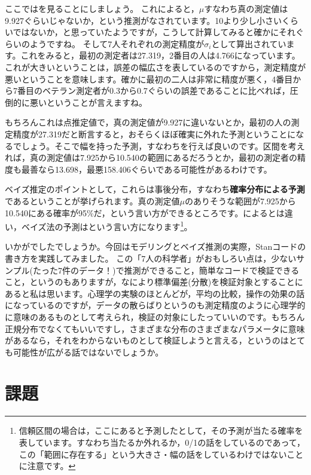 \documentclass{ltjsbook}
\begin{document}
ここではを見ることにしましょう。
これによると，$\mu$すなわち真の測定値は9.927ぐらいじゃないか，という推測がなされています。10より少し小さいくらいではないか，と思っていたようですが，こうして計算してみると確かにそれぐらいのようですね。
そして7人それぞれの測定精度が$\sigma_i$として算出されています。これをみると，最初の測定者は27.319，2番目の人は4.766になっています。これが大きいということは，誤差の幅広さを表しているのですから，測定精度が悪いということを意味します。確かに最初の二人は非常に精度が悪く，4番目から7番目のベテラン測定者が0.3から0.7ぐらいの誤差であることに比べれば，圧倒的に悪いということが言えますね。

もちろんこれは点推定値で，真の測定値が9.927に違いないとか，最初の人の測定精度が27.319だと断言すると，おそらくほぼ確実に外れた予測ということになるでしょう。そこで幅を持った予測，すなわちを行えば良いのです。区間を考えれば，真の測定値は7.925から10.540の範囲にあるだろうとか，最初の測定者の精度も最善なら13.698，最悪158.406ぐらいである可能性があるわけです。

ベイズ推定のポイントとして，これらは事後分布，すなわち\textbf{確率分布による予測}であるということが挙げられます。真の測定値$\mu$のありそうな範囲が7.925から10.540にある確率が95\%だ，という言い方ができるところです。によるとは違い，ベイズ法の予測はという言い方になります\footnote{信頼区間の場合は，ここにあると予測したとして，その予測が当たる確率を表しています。すなわち当たるか外れるか，0/1の話をしているのであって，この「範囲に存在する」という大きさ・幅の話をしているわけではないことに注意です。}。

いかがでしたでしょうか。今回はモデリングとベイズ推測の実際，Stanコードの書き方を実践してみました。
この「7人の科学者」がおもしろい点は，少ないサンプル(たった7件のデータ！)で推測ができること，簡単なコードで検証できること，というのもありますが，なにより標準偏差(分散)を検証対象とすることにあると私は思います。心理学の実験のほとんどが，平均の比較，操作の効果の話になっているのですが，データの散らばりというのも測定精度のように心理学的に意味のあるものとして考えられ，検証の対象にしたっていいのです。もちろん正規分布でなくてもいいですし，さまざまな分布のさまざまなパラメータに意味があるなら，それをわからないものとして検証しようと言える，というのはとても可能性が広がる話ではないでしょうか。
\section{課題}

\end{document}
